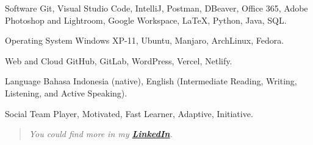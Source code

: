 \documentclass[11pt,a4paper]{article} %
\begin{document}

\headedsection %
{Software}{} {
    \headedsubsection %
    {Git, Visual Studio Code, IntelliJ, Postman, DBeaver, Office 365, Adobe Photoshop and Lightroom, Google Workspace, LaTeX, Python, Java, SQL.}{}{}
}

\headedsection
{Operating System}{} {
    \headedsubsection %
    {Windows XP-11, Ubuntu, Manjaro, ArchLinux, Fedora.}{}{}
}

\headedsection
{Web and Cloud}{} {
    \headedsubsection %
    {GitHub, GitLab, WordPress, Vercel, Netlify.}{}{}
}

\headedsection
{Language}{} {
    \headedsubsection %
    {Bahasa Indonesia (native), English (Intermediate Reading, Writing, Listening, and Active Speaking).}{}{}
}

\headedsection
{Social}{} {
    \headedsubsection %
    {Team Player, Motivated, Fast Learner, Adaptive, Initiative.}{}{}
}

\begin{quote}
    \begin{center}
        \textit{You could find more in my \href{https://www.linkedin.com/in/aaronpmurniadi/}{\textbf{LinkedIn}}.}
    \end{center}
\end{quote}

\end{document}
